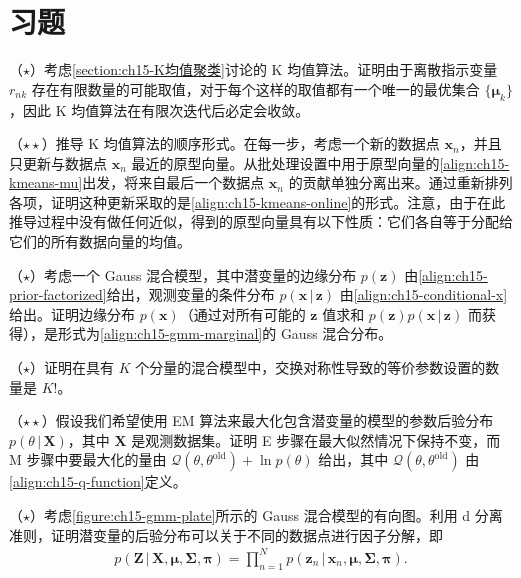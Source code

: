 \documentclass[../../main.tex]{subfiles}
\begin{document}
\section{习题}\label{section:ch15-习题}

\begin{exercise}\label{exercise:ch15-01}
（$\star$）考虑\cref{section:ch15-K均值聚类}讨论的 K 均值算法。证明由于离散指示变量 $r_{nk}$ 存在有限数量的可能取值，对于每个这样的取值都有一个唯一的最优集合 $\{\bm{\mu}_k\}$，因此 K 均值算法在有限次迭代后必定会收敛。
\end{exercise}

\begin{exercise}\label{exercise:ch15-02}
（$\star\star$）推导 K 均值算法的顺序形式。在每一步，考虑一个新的数据点 $\bm{x}_n$，并且只更新与数据点 $\bm{x}_n$ 最近的原型向量。从批处理设置中用于原型向量的\eqref{align:ch15-kmeans-mu}出发，将来自最后一个数据点 $\bm{x}_n$ 的贡献单独分离出来。通过重新排列各项，证明这种更新采取的是\eqref{align:ch15-kmeans-online}的形式。注意，由于在此推导过程中没有做任何近似，得到的原型向量具有以下性质：它们各自等于分配给它们的所有数据向量的均值。
\end{exercise}

\begin{exercise}\label{exercise:ch15-03}
（$\star$）考虑一个 Gauss 混合模型，其中潜变量的边缘分布 $p(\bm{z})$ 由\eqref{align:ch15-prior-factorized}给出，观测变量的条件分布 $p(\bm{x}\,|\,\bm{z})$ 由\eqref{align:ch15-conditional-x}给出。证明边缘分布 $p(\bm{x})$（通过对所有可能的 $\bm{z}$ 值求和 $p(\bm{z})p(\bm{x}\,|\,\bm{z})$ 而获得），是形式为\eqref{align:ch15-gmm-marginal}的 Gauss 混合分布。
\end{exercise}

\begin{exercise}\label{exercise:ch15-04}
（$\star$）证明在具有 $K$ 个分量的混合模型中，交换对称性导致的等价参数设置的数量是 $K!$。
\end{exercise}

\begin{exercise}\label{exercise:ch15-05}
（$\star\star$）假设我们希望使用 EM 算法来最大化包含潜变量的模型的参数后验分布 $p(\theta\,|\,\bm{X})$，其中 $\bm{X}$ 是观测数据集。证明 E 步骤在最大似然情况下保持不变，而 M 步骤中要最大化的量由 $\mathcal{Q}(\theta,\theta^{\text{old}})+\ln p(\theta)$ 给出，其中 $\mathcal{Q}(\theta,\theta^{\text{old}})$ 由\eqref{align:ch15-q-function}定义。
\end{exercise}

\begin{exercise}\label{exercise:ch15-06}
（$\star$）考虑\cref{figure:ch15-gmm-plate}所示的 Gauss 混合模型的有向图。利用 d 分离准则，证明潜变量的后验分布可以关于不同的数据点进行因子分解，即
\begin{align}
p(\bm{Z}\,|\,\bm{X},\bm{\mu},\bm{\Sigma},\bm{\pi})=\prod_{n=1}^{N}p(\bm{z}_n\,|\,\bm{x}_n,\bm{\mu},\bm{\Sigma},\bm{\pi}).
\label{align:ch15-ex-factor}
\end{align}
\end{exercise}
\end{document}
